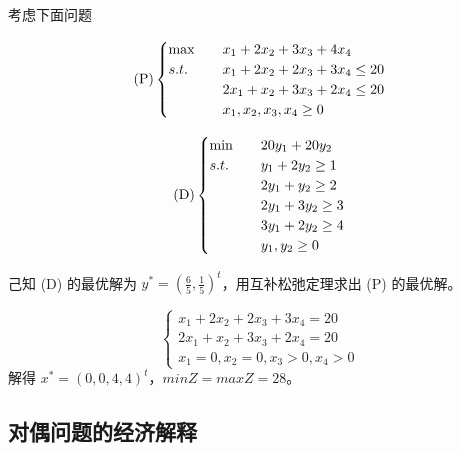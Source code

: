 \begin{example}
    考虑下面问题

    \begin{minipage}[c]{0.45\linewidth}
        \[
            \text{(P)}
            \begin{cases}
                \max \quad &x_1 + 2x_2 + 3x_3 + 4x_4\\
                s.t. \quad &x_1 + 2x_2 + 2x_3 + 3x_4 \le 20\\
                &2x_1 + x_2 + 3x_3 + 2x_4 \le 20\\
                &x_1, x_2, x_3, x_4 \ge 0
            \end{cases}    
        \]
    \end{minipage}
    \begin{minipage}[c]{0.45\linewidth}
        \[
            \text{(D)}
            \begin{cases}
                \min \quad &20y_1 + 20y_2\\
                s.t. \quad &y_1 + 2y_2 \ge 1\\
                &2y_1 + y_2 \ge 2\\
                &2y_1 + 3y_2 \ge 3\\
                &3y_1 + 2y_2 \ge 4\\
                &y_1, y_2 \ge 0
            \end{cases}
        \]
    \end{minipage}

    己知 (D) 的最优解为 $y^* = \left(\frac{6}{5}, \frac{1}{5}\right)^t$，用互补松弛定理求出 (P) 的最优解。

    \answer
    \[
        \begin{cases}
            x_1 + 2x_2 + 2x_3 + 3x_4 = 20\\
            2x_1 + x_2 + 3x_3 + 2x_4 = 20\\
            x_1 = 0, x_2 = 0, x_3 > 0, x_4 > 0
        \end{cases}    
    \]
    解得 $x^* = (0, 0, 4, 4)^t$，$minZ = maxZ = 28$。
\end{example}

\subsection{对偶问题的经济解释}
